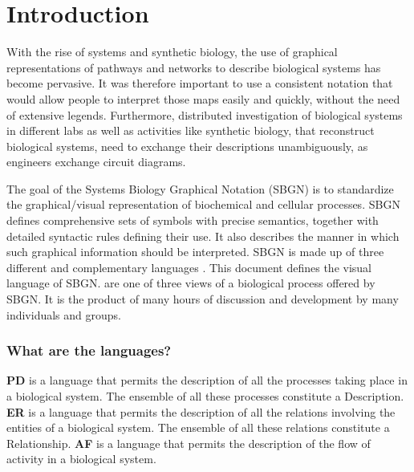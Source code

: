 

\chapter{Introduction}

With the rise of systems and synthetic biology, the use of graphical
representations of pathways and networks to describe biological
systems has become pervasive. It was therefore important to use a
consistent notation that would allow people to interpret those maps
easily and quickly, without the need of extensive
legends. Furthermore, distributed investigation of biological systems
in different labs as well as activities like synthetic biology, that
reconstruct biological systems, need to exchange their descriptions
unambiguously, as engineers exchange circuit diagrams.

The goal of the Systems Biology Graphical Notation (SBGN) is to
standardize the graphical/visual representation of biochemical and
cellular processes. SBGN defines comprehensive sets of symbols with
precise semantics, together with detailed syntactic rules defining
their use. It also describes the manner in which such graphical
information should be interpreted. SBGN is made up of three different
and complementary languages \cite{LeNovere:2009p1}. This document
defines the \emph{\PD} visual language of SBGN. \PDs are one of three
views of a biological process offered by SBGN.  It is the product of
many hours of discussion and development by many individuals and
groups.
 
\subsection{What are the languages?}

\textbf{PD} is a language that permits the description of all the processes taking place in a biological system. The ensemble of all these processes constitute a Description. \textbf{ER} is a language that permits the description of all the relations involving the entities of a biological system. The ensemble of all these relations constitute a Relationship.\textbf{ AF} is a language that permits the description of the flow of activity in a biological system.

